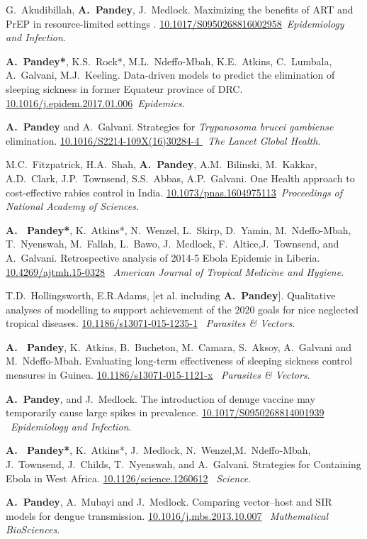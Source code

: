 \documentclass[margin,line,pifont,palatino,courier]{res}
\newcommand\doilink[1]{\href{http://dx.doi.org/#1}{#1}}
\begin{document}
\begin{resume}
G.~Akudibillah, \textbf{A.~Pandey}, J.~Medlock. {Maximizing the benefits of ART and PrEP in resource-limited settings
}. \doilink{10.1017/S0950268816002958}~\textit{Epidemiology and Infection}.


\textbf{A.~Pandey*}, K.S.~Rock*, M.L.~Ndeffo-Mbah, K.E.~Atkins,
C.~Lumbala, A.~Galvani, M.J.~Keeling. {Data-driven
models to predict the elimination of sleeping sickness in former
Equateur province of DRC}. \doilink{10.1016/j.epidem.2017.01.006}~\textit{Epidemics}.

\textbf{A.~Pandey} and A.~Galvani. {Strategies for \textit{Trypanosoma
  brucei gambiense} elimination}. \doilink{10.1016/S2214-109X(16)30284-4
}~\textit{The Lancet Global Health}.

M.C.~Fitzpatrick, H.A.~Shah, \textbf{A.~Pandey}, A.M.~Bilinski,
M.~Kakkar, A.D.~Clark, J.P.~Townsend, S.S.~Abbas, A.P.~Galvani. {One
  Health approach to cost-effective rabies control in
  India}. \doilink{10.1073/pnas.1604975113}~\textit{Proceedings of National Academy of
  Sciences}.

\textbf{A. ~Pandey*}, K.~Atkins*, N.~Wenzel, L.~Skirp, D.~Yamin,
M.~Ndeffo-Mbah, T.~Nyenswah, M.~Fallah, L.~Bawo, J.~Medlock,
F.~Altice,J.~Townsend,  and A.~Galvani. {Retrospective analysis of
2014-5 Ebola Epidemic in Liberia}. \doilink{10.4269/ajtmh.15-0328}
~\textit{American Journal of Tropical Medicine and Hygiene}.

T.D.~Hollingsworth, E.R.Adams, [et al. including
\textbf{A.~Pandey}]. {Qualitative analyses of modelling to support
  achievement of the 2020 goals for nice neglected tropical
  diseases}. \doilink{10.1186/s13071-015-1235-1} ~\textit{Parasites \& Vectors}.

\textbf{A. ~Pandey}, K.~Atkins, B.~Bucheton, M.~Camara, S.~Aksoy, A.~Galvani
and M.~Ndeffo-Mbah. {Evaluating long-term effectiveness of sleeping
  sickness control measures in Guinea}. \doilink{10.1186/s13071-015-1121-x} ~\textit{Parasites \& Vectors}.

\textbf{A.~Pandey}, and J.~Medlock. {The introduction of denuge vaccine
may temporarily cause large spikes in
prevalence}. \doilink{10.1017/S0950268814001939} ~\textit{Epidemiology and Infection}.

\textbf{A. ~Pandey*}, K.~Atkins*, J.~Medlock, N.~Wenzel,M.~Ndeffo-Mbah,
J.~Townsend, J.~Childs, T.~Nyenswah, and A.~Galvani. {Strategies
  for Containing Ebola in West Africa}. \doilink{10.1126/science.1260612} ~\textit{Science}.

\textbf{A.~Pandey}, A.~Mubayi and J.~Medlock.  {Comparing
  vector--host and SIR models for dengue
  transmission}. \doilink{10.1016/j.mbs.2013.10.007}
~\textit{Mathematical BioSciences}.




\end{resume}
\end{document}
